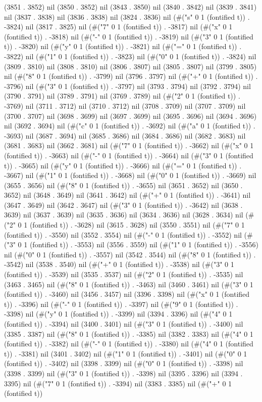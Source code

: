 (3851 . 3852) nil (3850 . 3852) nil (3843 . 3850) nil (3840 . 3842) nil (3839 . 3841) nil (3837 . 3838) nil (3836 . 3838) nil (3824 . 3836) nil (#("s" 0 1 (fontified t)) . -3824) nil (3817 . 3825) nil (#("7" 0 1 (fontified t)) . -3817) nil (#("x" 0 1 (fontified t)) . -3818) nil (#("-" 0 1 (fontified t)) . -3819) nil (#("3" 0 1 (fontified t)) . -3820) nil (#("y" 0 1 (fontified t)) . -3821) nil (#("=" 0 1 (fontified t)) . -3822) nil (#("1" 0 1 (fontified t)) . -3823) nil (#("0" 0 1 (fontified t)) . -3824) nil (3809 . 3810) nil (3808 . 3810) nil (3806 . 3807) nil (3805 . 3807) nil (3799 . 3805) nil (#("8" 0 1 (fontified t)) . -3799) nil (3796 . 3797) nil (#("+" 0 1 (fontified t)) . -3796) nil (#("3" 0 1 (fontified t)) . -3797) nil (3793 . 3794) nil (3792 . 3794) nil (3790 . 3791) nil (3789 . 3791) nil (3769 . 3789) nil (#("2" 0 1 (fontified t)) . -3769) nil (3711 . 3712) nil (3710 . 3712) nil (3708 . 3709) nil (3707 . 3709) nil (3700 . 3707) nil (3698 . 3699) nil (3697 . 3699) nil (3695 . 3696) nil (3694 . 3696) nil (3692 . 3694) nil (#("c" 0 1 (fontified t)) . -3692) nil (#("a" 0 1 (fontified t)) . -3693) nil (3687 . 3694) nil (3685 . 3686) nil (3684 . 3686) nil (3682 . 3683) nil (3681 . 3683) nil (3662 . 3681) nil (#("7" 0 1 (fontified t)) . -3662) nil (#("x" 0 1 (fontified t)) . -3663) nil (#("-" 0 1 (fontified t)) . -3664) nil (#("3" 0 1 (fontified t)) . -3665) nil (#("y" 0 1 (fontified t)) . -3666) nil (#("=" 0 1 (fontified t)) . -3667) nil (#("1" 0 1 (fontified t)) . -3668) nil (#("0" 0 1 (fontified t)) . -3669) nil (3655 . 3656) nil (#("8" 0 1 (fontified t)) . -3655) nil (3651 . 3652) nil (3650 . 3652) nil (3648 . 3649) nil (3641 . 3642) nil (#("+" 0 1 (fontified t)) . -3641) nil (3647 . 3649) nil (3642 . 3647) nil (#("3" 0 1 (fontified t)) . -3642) nil (3638 . 3639) nil (3637 . 3639) nil (3635 . 3636) nil (3634 . 3636) nil (3628 . 3634) nil (#("2" 0 1 (fontified t)) . -3628) nil (3615 . 3628) nil (3550 . 3551) nil (#("7" 0 1 (fontified t)) . -3550) nil (3552 . 3554) nil (#("-" 0 1 (fontified t)) . -3552) nil (#("3" 0 1 (fontified t)) . -3553) nil (3556 . 3559) nil (#("1" 0 1 (fontified t)) . -3556) nil (#("0" 0 1 (fontified t)) . -3557) nil (3542 . 3544) nil (#("8" 0 1 (fontified t)) . -3542) nil (3538 . 3540) nil (#("+" 0 1 (fontified t)) . -3538) nil (#("3" 0 1 (fontified t)) . -3539) nil (3535 . 3537) nil (#("2" 0 1 (fontified t)) . -3535) nil (3463 . 3465) nil (#("8" 0 1 (fontified t)) . -3463) nil (3460 . 3461) nil (#("3" 0 1 (fontified t)) . -3460) nil (3456 . 3457) nil (3396 . 3398) nil (#("x" 0 1 (fontified t)) . -3396) nil (#("-" 0 1 (fontified t)) . -3397) nil (#("9" 0 1 (fontified t)) . -3398) nil (#("y" 0 1 (fontified t)) . -3399) nil (3394 . 3396) nil (#("4" 0 1 (fontified t)) . -3394) nil (3400 . 3401) nil (#("3" 0 1 (fontified t)) . -3400) nil (3385 . 3387) nil (#("8" 0 1 (fontified t)) . -3385) nil (3382 . 3383) nil (#("4" 0 1 (fontified t)) . -3382) nil (#("-" 0 1 (fontified t)) . -3380) nil (#("4" 0 1 (fontified t)) . -3381) nil (3401 . 3402) nil (#("1" 0 1 (fontified t)) . -3401) nil (#("0" 0 1 (fontified t)) . -3402) nil (3398 . 3399) nil (#("0" 0 1 (fontified t)) . -3398) nil (3398 . 3399) nil (#("3" 0 1 (fontified t)) . -3398) nil (3395 . 3396) nil (3394 . 3395) nil (#("7" 0 1 (fontified t)) . -3394) nil (3383 . 3385) nil (#("+" 0 1 (fontified t)) 